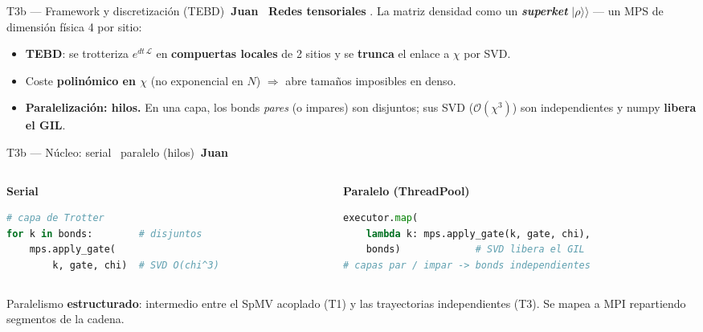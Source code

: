\documentclass[aspectratio=169,10pt]{beamer}
\newcommand{\J}{\hfill\colorbox{juan}{\color{white}\scriptsize\bfseries~Juan~}}
\newcommand{\cs}[1]{\textcolor{seb}{\textbf{#1}}}
\newcommand{\Lop}{\mathcal{L}}
\begin{document}
\begin{frame}{T3b — Framework y discretización (TEBD)\J}
  \small
  \textbf{Redes tensoriales} \cite{Weimer2021,Orus2014}. La matriz densidad como un
  \cs{\emph{superket}} $|\rho\rangle\rangle$ --- un MPS de dimensión física 4 por sitio:
  \begin{itemize}
    \item \textbf{TEBD}: se trotteriza $e^{dt\,\Lop}$ en \textbf{compuertas locales} de
      2 sitios y se \textbf{trunca} el enlace a $\chi$ por SVD.
    \item Coste \cs{polinómico en $\chi$} (no exponencial en $N$) $\Rightarrow$ abre
      tamaños imposibles en denso.
    \item \textbf{Paralelización: hilos.} En una capa, los bonds \emph{pares} (o
      impares) son disjuntos; sus SVD ($\mathcal{O}(\chi^3)$) son independientes y numpy
      \cs{libera el GIL}.
  \end{itemize}
\end{frame}

\begin{frame}[fragile]{T3b — Núcleo: serial \textbar\ paralelo (hilos)\J}
  \begin{columns}[T]
  \begin{column}{0.46\textwidth}\centering\textbf{\small Serial}
\begin{lstlisting}[language=Python]
# capa de Trotter
for k in bonds:        # disjuntos
    mps.apply_gate(
        k, gate, chi)  # SVD O(chi^3)
\end{lstlisting}
  \end{column}
  \begin{column}{0.54\textwidth}\centering\textbf{\small Paralelo (ThreadPool)}
\begin{lstlisting}[language=Python]
executor.map(
    lambda k: mps.apply_gate(k, gate, chi),
    bonds)             # SVD libera el GIL
# capas par / impar -> bonds independientes
\end{lstlisting}
  \end{column}
  \end{columns}
  \vfill
  {\small Paralelismo \cs{estructurado}: intermedio entre el SpMV acoplado (T1) y las
  trayectorias independientes (T3). Se mapea a MPI repartiendo segmentos de la cadena.}
\end{frame}
\end{document}
